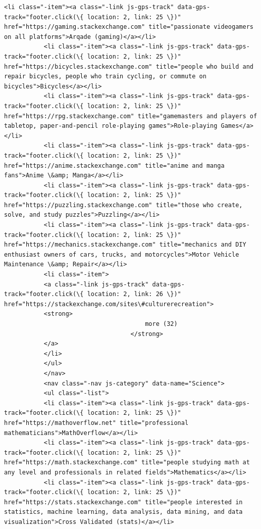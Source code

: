 \documentclass[11pt]{article}
\begin{document}
\begin{Verbatim}[commandchars=\\\{\}]
           <li class="-item"><a class="-link js-gps-track" data-gps-track="footer.click(\{ location: 2, link: 25 \})" href="https://gaming.stackexchange.com" title="passionate videogamers on all platforms">Arqade (gaming)</a></li>
           <li class="-item"><a class="-link js-gps-track" data-gps-track="footer.click(\{ location: 2, link: 25 \})" href="https://bicycles.stackexchange.com" title="people who build and repair bicycles, people who train cycling, or commute on bicycles">Bicycles</a></li>
           <li class="-item"><a class="-link js-gps-track" data-gps-track="footer.click(\{ location: 2, link: 25 \})" href="https://rpg.stackexchange.com" title="gamemasters and players of tabletop, paper-and-pencil role-playing games">Role-playing Games</a></li>
           <li class="-item"><a class="-link js-gps-track" data-gps-track="footer.click(\{ location: 2, link: 25 \})" href="https://anime.stackexchange.com" title="anime and manga fans">Anime \&amp; Manga</a></li>
           <li class="-item"><a class="-link js-gps-track" data-gps-track="footer.click(\{ location: 2, link: 25 \})" href="https://puzzling.stackexchange.com" title="those who create, solve, and study puzzles">Puzzling</a></li>
           <li class="-item"><a class="-link js-gps-track" data-gps-track="footer.click(\{ location: 2, link: 25 \})" href="https://mechanics.stackexchange.com" title="mechanics and DIY enthusiast owners of cars, trucks, and motorcycles">Motor Vehicle Maintenance \&amp; Repair</a></li>
           <li class="-item">
           <a class="-link js-gps-track" data-gps-track="footer.click(\{ location: 2, link: 26 \})" href="https://stackexchange.com/sites\#culturerecreation">
           <strong>
                                       more (32)
                                   </strong>
           </a>
           </li>
           </ul>
           </nav>
           <nav class="-nav js-category" data-name="Science">
           <ul class="-list">
           <li class="-item"><a class="-link js-gps-track" data-gps-track="footer.click(\{ location: 2, link: 25 \})" href="https://mathoverflow.net" title="professional mathematicians">MathOverflow</a></li>
           <li class="-item"><a class="-link js-gps-track" data-gps-track="footer.click(\{ location: 2, link: 25 \})" href="https://math.stackexchange.com" title="people studying math at any level and professionals in related fields">Mathematics</a></li>
           <li class="-item"><a class="-link js-gps-track" data-gps-track="footer.click(\{ location: 2, link: 25 \})" href="https://stats.stackexchange.com" title="people interested in statistics, machine learning, data analysis, data mining, and data visualization">Cross Validated (stats)</a></li>

\end{Verbatim}
\end{document}
